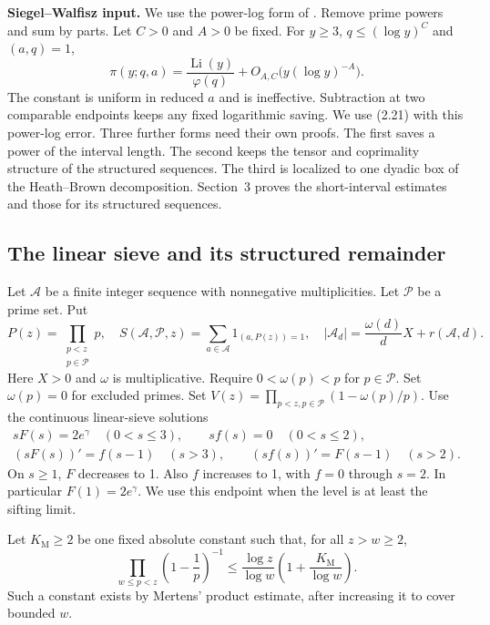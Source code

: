 \textbf{Siegel--Walfisz input.} We use the power-log form of
\cite[Corollary~5.29]{IK04}. Remove prime powers and sum by parts.
Let $C>0$ and $A>0$ be fixed. For $y\geq3$, $q\leq(\log y)^C$
and $(a,q)=1$,
\[
 \pi(y;q,a)=\frac{\operatorname{Li}(y)}{\varphi(q)}
 +O_{A,C}\bigl(y(\log y)^{-A}\bigr).
\tag{2.21}\label{p1:eq:2.21}
\]
The constant is uniform in reduced $a$ and is ineffective. Subtraction at two comparable endpoints keeps any fixed logarithmic saving. We use (2.21) with this power-log error. Three further forms need their own proofs. The first saves a power of the interval length. The second keeps the tensor and coprimality structure of the structured sequences. The third is localized to one dyadic box of the Heath--Brown decomposition. Section~3 proves the short-interval estimates and those for its structured sequences.

\subsection{The linear sieve and its structured remainder}

Let $\mathcal A$ be a finite integer sequence with nonnegative multiplicities. Let $\mathcal P$ be a prime set. Put
\[
 P(z)=\prod_{\substack{p<z\\p\in\mathcal P}}p,\quad
 S(\mathcal A,\mathcal P,z)=\sum_{a\in\mathcal A}1_{(a,P(z))=1},
 \quad |\mathcal A_d|=\frac{\omega(d)}dX+r(\mathcal A,d).
\tag{2.22}\label{p1:eq:2.22}
\]
Here $X>0$ and $\omega$ is multiplicative. Require $0<\omega(p)<p$ for $p\in\mathcal P$. Set $\omega(p)=0$ for excluded primes. Set $V(z)=\prod_{p<z,p\in\mathcal P}(1-\omega(p)/p)$. Use the continuous linear-sieve solutions
\[
\begin{gathered}
 sF(s)=2e^\gamma\quad(0<s\leq3),\qquad
 sf(s)=0\quad(0<s\leq2),\\
 (sF(s))'=f(s-1)\quad(s>3),\qquad
 (sf(s))'=F(s-1)\quad(s>2).
\end{gathered}
\tag{2.23}\label{p1:eq:2.23}
\]
On $s\geq1$, $F$ decreases to 1. Also $f$ increases to 1, with $f=0$ through $s=2$. In particular $F(1)=2e^\gamma$. We use this endpoint when the level is at least the sifting limit.

Let $K_{\mathrm M}\geq2$ be one fixed absolute constant such that, for all
$z>w\geq2$,
\[
 \prod_{w\leq p<z}\left(1-\frac1p\right)^{-1}
 \leq\frac{\log z}{\log w}\left(1+\frac{K_{\mathrm M}}{\log w}\right).
\]
Such a constant exists by Mertens' product estimate, after increasing it
to cover bounded $w$.

